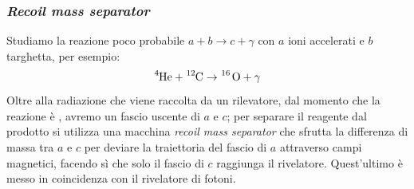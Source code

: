 \subsubsection{\textit{Recoil mass separator}}
Studiamo la reazione poco probabile $a+b \to c+\gamma$ con $a$ ioni accelerati e $b$ targhetta, per esempio:
$$\ce{^4He} + \ce{^{12}C}\to \ce{^{16} O}+\gamma$$
Oltre alla radiazione che viene raccolta da un rilevatore, dal momento che la reazione è , avremo un fascio uscente di $a$ e $c$; per separare il reagente dal prodotto si utilizza una macchina \textit{recoil mass separator} che sfrutta la differenza di massa tra $a$ e $c$ per deviare la traiettoria del fascio di $a$ attraverso campi magnetici, facendo sì che solo il fascio di $c$ raggiunga il rivelatore. Quest'ultimo è messo in coincidenza con il rivelatore di fotoni.

